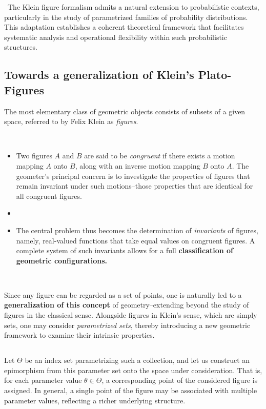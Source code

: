 \,
The Klein figure formalism admits a natural extension to probabilistic contexts, particularly in the study of parametrized families of probability distributions. This adaptation establishes a coherent theoretical framework that facilitates systematic analysis and operational flexibility within such probabilistic structures.

\subsection{Towards a generalization of Klein's Plato-Figures}
The most elementary class of geometric objects consists of subsets of a given space, referred to by Felix Klein as \textit{figures}.

\,

\begin{itemize}
    \item Two figures $A$ and $B$ are said to be \textit{congruent} if there exists a motion mapping $A$ onto $B$, along with an inverse motion mapping $B$ onto $A$. The geometer’s principal concern is to investigate the properties of figures that remain invariant under such motions--those properties that are identical for all congruent figures. 
    \item[]
    \item The central problem thus becomes the determination of \textit{invariants} of figures, namely, real-valued functions that take equal values on congruent figures. A complete system of such invariants allows for a full {\bf classification of geometric configurations. }
\end{itemize}

\, 

Since any figure can be regarded as a set of points, one is naturally led to a {\bf generalization of this concept } of geometry--extending beyond the study of figures in the classical sense. Alongside figures in Klein’s sense, which are simply sets, one may consider \textit{parametrized sets}, thereby introducing a new geometric framework to examine their intrinsic properties.

\subsection{}

Let $\Theta$ be an index set parametrizing such a collection, and let us construct an epimorphism from this parameter set onto the space under consideration. That is, for each parameter value $\theta \in \Theta$, a corresponding point of the considered figure is assigned. In general, a single point of the figure may be associated with multiple parameter values, reflecting a richer underlying structure.

